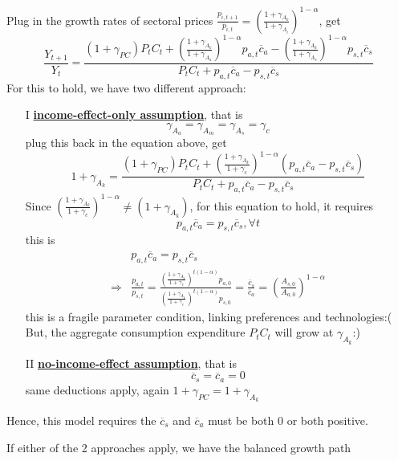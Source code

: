 \documentclass[10pt,landscape,a4paper]{article}
\let\bar\overline
\begin{document}
\begin{multicols*}{3}
Plug in the growth rates of sectoral prices $\frac{p_{i,t+1}}{p_{i,t}}=\left(\frac{1+\gamma_{A_k}}{1+\gamma_{A_i}}\right)^{1-\alpha}$, get
$$
\frac{Y_{t+1}}{Y_t} = \frac{\left(1+\gamma_{PC}\right)P_tC_t + \left(\frac{1+\gamma_{A_k}}{1+\gamma_{A_a}}\right)^{1-\alpha}p_{a,t}\bar{c}_a-\left(\frac{1+\gamma_{A_k}}{1+\gamma_{A_s}}\right)^{1-\alpha}p_{s,t}\bar{c}_s}{P_tC_t +p_{a,t}\bar{c}_a-p_{s,t}\bar{c}_s}
$$
For this to hold, we have two different approach:
\begin{itemize}
    \item[I] \underline{\textbf{income-effect-only assumption}}, that is 
    $$
    \gamma_{A_a}=\gamma_{A_m}=\gamma_{A_s}=\gamma_{c}
    $$
    plug this back in the equation above, get
    $$
    1+\gamma_{A_k}= \frac{\left(1+\gamma_{PC}\right)P_tC_t + \left(\frac{1+\gamma_{A_k}}{1+\gamma_c}\right)^{1-\alpha}\left(p_{a,t}\bar{c}_a-p_{s,t}\bar{c}_s\right)}{P_tC_t +p_{a,t}\bar{c}_a-p_{s,t}\bar{c}_s}
    $$
    Since $\left(\frac{1+\gamma_{A_k}}{1+\gamma_c}\right)^{1-\alpha}\neq (1+\gamma_{A_k})$, for this equation to hold, it requires
    $$
    p_{a,t}\bar{c}_a=p_{s,t}\bar{c}_s,\forall t
    $$
    this is
    \begin{align*}
        & p_{a,t}\bar{c}_a=p_{s,t}\bar{c}_s\\
        \Rightarrow &  \frac{p_{a,t}}{p_{s,t}}=\frac{\left(\frac{1+\gamma_{A_k}}{1+\gamma_c}\right)^{t(1-\alpha)}p_{a,0}}{\left(\frac{1+\gamma_{A_k}}{1+\gamma_c}\right)^{t(1-\alpha)}p_{s,0}}=\frac{\bar{c}_s}{\bar{c}_a} = \left(\frac{A_{s,0}}{A_{a,0}}\right)^{1-\alpha}
    \end{align*}
    this is a fragile parameter condition, linking preferences and technologies:(
    But, the aggregate consumption expenditure $P_tC_t$ will grow at $\gamma_{A_k}$:)
    
    \item[II] \underline{\textbf{no-income-effect assumption}}, that is
    $$
    \bar{c}_s= \bar{c}_a =0
    $$
    same deductions apply, again $1+\gamma_{PC}=1+\gamma_{A_k}$
\end{itemize}

Hence, this model requires the $\bar{c}_s$ and $\bar{c}_a$ must be both 0 or both positive.

If either of the 2 approaches apply, we have the balanced growth path


\end{multicols*}
\end{document}
